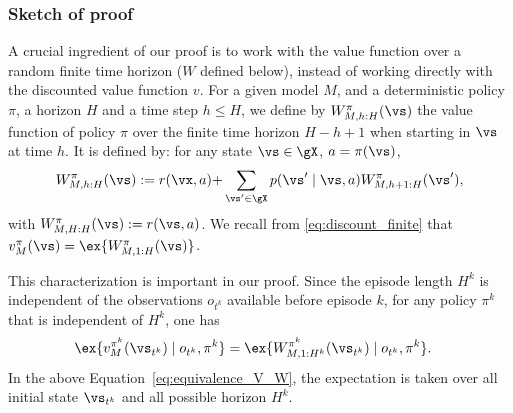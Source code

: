 \subsubsection*{Sketch of proof}
A crucial ingredient of our proof is to work with the value function over a random finite time horizon ($W$ defined below), instead of working directly with the discounted value function $v$. For a given model $M$, and a deterministic policy $\pi$, a horizon $H$ and a time step $h\le H$, we define by $W_{M,{h:H}}^\pi(\vs)$ the value function of policy $\pi$ over the finite time horizon ${H-h+1}$ when starting in $\vs$ at time $h$. It is defined by: for any state $\vs\in\gX$, $a=\pi(\vs)$,
\begin{equation}
    \label{eq:discounted_reward}
    W_{M,{h:H}}^\pi(\vs)  :=  r(\vx,a) {+}\sum_{\vs'\in\gX}p(\vs'\mid \vs,a)W_{M,{h+1:H}}^\pi(\vs'),
\end{equation}
with $W_{M,{H:H}}^\pi(\vs):=r(\vs,a)$. %
We recall from \eqref{eq:discount_finite} that $v^{\pi}_M(\vs)=\ex{W_{M,1:H}^\pi(\vs)}$.


This characterization is important in our proof. Since the episode length $H^k$ is independent of the observations $o_{t^k}$ available before episode $k$, for any policy $\pi^k$ that is independent of $H^k$, one has
\begin{align}
    \ex{v^{\pi^k}_M(\vs_{t^k}) \mid {o_{t^k}}, \pi^k } 
    &= \ex{W^{\pi^k}_{M,1:H^k}(\vs_{t^k}) \mid {o_{t^k}}, \pi^k }.
    \label{eq:equivalence_V_W}
\end{align}
In the above Equation~\eqref{eq:equivalence_V_W}, the expectation is taken over all initial state $\vs_{t^k}$ and all possible horizon $H^k$.
    
